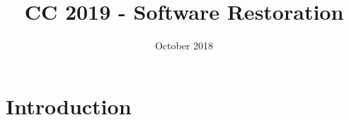 \documentclass{article}
\title{CC 2019 - Software Restoration}
\author{ }
\date{October 2018}
\begin{document}
\maketitle

\section{Introduction}
\end{document}
